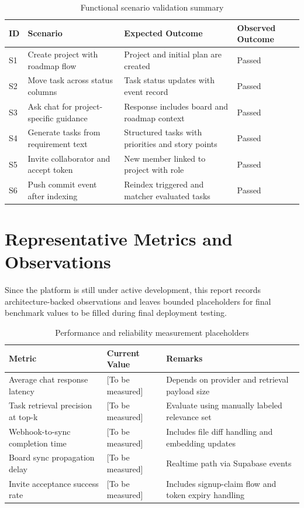 \documentclass[a4paper, 11pt, oneside]{Dissertation}
\begin{document}
\begin{table}[H]
\centering
\begin{tabular}{|C{0.9cm}|L{4.2cm}|L{3.0cm}|L{3.1cm}|}
\hline
\textbf{ID} & \textbf{Scenario} & \textbf{Expected Outcome} & \textbf{Observed Outcome} \\
\hline
S1 & Create project with roadmap flow & Project and initial plan are created & Passed \\
\hline
S2 & Move task across status columns & Task status updates with event record & Passed \\
\hline
S3 & Ask chat for project-specific guidance & Response includes board and roadmap context & Passed \\
\hline
S4 & Generate tasks from requirement text & Structured tasks with priorities and story points & Passed \\
\hline
S5 & Invite collaborator and accept token & New member linked to project with role & Passed \\
\hline
S6 & Push commit event after indexing & Reindex triggered and matcher evaluated tasks & Passed \\
\hline
\end{tabular}
\caption{Functional scenario validation summary}
\label{tab:functional-validation}
\end{table}

\FloatBarrier

\section{Representative Metrics and Observations}
Since the platform is still under active development, this report records architecture-backed observations and leaves bounded placeholders for final benchmark values to be filled during final deployment testing.

\begin{table}[H]
\centering
\begin{tabular}{|L{4.7cm}|C{2.6cm}|L{4.0cm}|}
\hline
\textbf{Metric} & \textbf{Current Value} & \textbf{Remarks} \\
\hline
Average chat response latency & [To be measured] & Depends on provider and retrieval payload size \\
\hline
Task retrieval precision at top-k & [To be measured] & Evaluate using manually labeled relevance set \\
\hline
Webhook-to-sync completion time & [To be measured] & Includes file diff handling and embedding updates \\
\hline
Board sync propagation delay & [To be measured] & Realtime path via Supabase events \\
\hline
Invite acceptance success rate & [To be measured] & Includes signup-claim flow and token expiry handling \\
\hline
\end{tabular}
\caption{Performance and reliability measurement placeholders}
\label{tab:metrics-placeholders}
\end{table}
\end{document}
